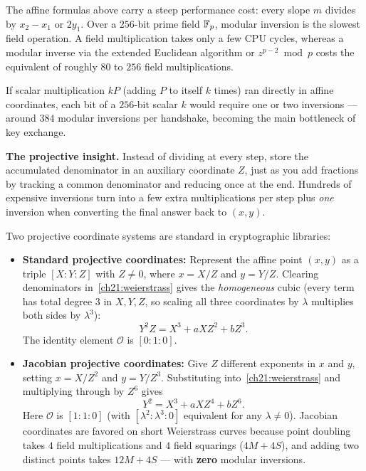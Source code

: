 The affine formulas above carry a steep performance cost: every slope $m$ divides by
$x_2 - x_1$ or $2y_1$. Over a $256$-bit prime field $\mathbb{F}_p$, modular inversion is the
slowest field operation. A field multiplication takes only a few CPU cycles, whereas a
modular inverse via the extended Euclidean algorithm or $z^{p-2} \bmod p$ costs the
equivalent of roughly $80$ to $256$ field multiplications.

If scalar multiplication $kP$ (adding $P$ to itself $k$ times) ran directly in affine
coordinates, each bit of a $256$-bit scalar $k$ would require one or two inversions ---
around $384$ modular inversions per handshake, becoming the main bottleneck of key exchange.

\begin{intuitionbox}
\textbf{The projective insight.} Instead of dividing at every step, store the
accumulated denominator in an auxiliary coordinate $Z$, just as you add fractions by
tracking a common denominator and reducing once at the end. Hundreds of expensive
inversions turn into a few extra multiplications per step plus \emph{one} inversion when
converting the final answer back to $(x,y)$.
\end{intuitionbox}

Two projective coordinate systems are standard in cryptographic libraries:

\begin{itemize}
  \item \textbf{Standard projective coordinates:} Represent the affine point $(x, y)$ as
        a triple $[X : Y : Z]$ with $Z \neq 0$, where $x = X/Z$ and $y = Y/Z$. Clearing
        denominators in~\eqref{ch21:weierstrass} gives the \emph{homogeneous} cubic (every
        term has total degree $3$ in $X, Y, Z$, so scaling all three coordinates by
        $\lambda$ multiplies both sides by $\lambda^3$):
        \[
        Y^2 Z = X^3 + a X Z^2 + b Z^3.
        \]
        The identity element $\mathcal{O}$ is $[0 : 1 : 0]$.
  \item \textbf{Jacobian projective coordinates:} Give $Z$ different exponents in $x$ and
        $y$, setting $x = X/Z^2$ and $y = Y/Z^3$. Substituting into~\eqref{ch21:weierstrass}
        and multiplying through by $Z^6$ gives
        \[
        Y^2 = X^3 + a X Z^4 + b Z^6.
        \]
        Here $\mathcal{O}$ is $[1 : 1 : 0]$ (with $[\lambda^2 : \lambda^3 : 0]$ equivalent
        for any $\lambda \neq 0$). Jacobian coordinates are favored on short Weierstrass
        curves because point doubling takes $4$ field multiplications and $4$ field
        squarings ($4M + 4S$), and adding two distinct points takes $12M + 4S$ --- with
        \textbf{zero} modular inversions.
\end{itemize}

